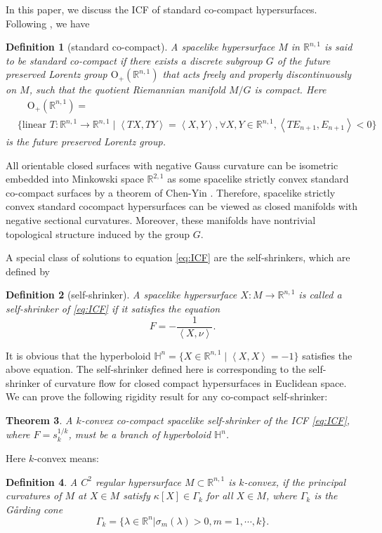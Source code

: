 \documentclass[10pt,a4paper]{amsart}
\newtheorem{theorem}{Theorem}[section]
\newcommand{\R}{\ensuremath{\mathbb{R}}}
\renewcommand{\H}{{\mathbb{H}}}
\newcommand{\ip}[2]{\ensuremath{\left< {#1}, {#2} \right>}}
\newtheorem{definition}[theorem]{Definition}
\numberwithin{equation}{section}
\begin{document}
\par In this paper, we discuss the ICF of standard co-compact hypersurfaces. Following \cite{co-compact}, we have 
\begin{definition}[standard co-compact]\label{defn:std co-compact}
A spacelike hypersurface $M$ in $\mathbb{R}^{n,1}$ is said to be standard co-compact if there exists a discrete subgroup $G$ of the future preserved Lorentz group $\mathrm{O}_+(\mathbb{R}^{n,1})$ that acts freely and properly discontinuously on $M$, such that the quotient Riemannian manifold $M/G$ is compact. Here 
$$ \begin{aligned}
    &\quad \mathrm{O}_+(\mathbb{R}^{n,1}) = \\
    & \Big\{\text{linear } T:\R^{n,1}\to \R^{n,1} \mid \ip{TX}{TY} = \ip{X}{Y}, \forall X,Y\in \R^{n,1}, \ip{TE_{n+1}}{E_{n+1}} < 0 \Big\}
\end{aligned} $$
is the future preserved Lorentz group. 
\end{definition} 
 All orientable closed surfaces with negative Gauss curvature can be isometric embedded into Minkowski space $\mathbb{R}^{2,1}$ as some spacelike strictly convex standard co-compact surfaces by a theorem of Chen-Yin \cite{ChYin}. Therefore, spacelike strictly convex standard cocompact hypersurfaces can be viewed as closed manifolds with negative sectional curvatures. Moreover, these manifolds have nontrivial topological structure induced by the group $G$.              



\par A special class of solutions to equation \eqref{eq:ICF} are the self-shrinkers, which are defined by 
\begin{definition}[self-shrinker]
    A spacelike hypersurface \(X:M\to \R^{n,1}\) is called a self-shrinker of \eqref{eq:ICF} if it satisfies the equation 
    \begin{equation}\label{eq:self-shrinker}
        F = -\frac{1}{\ip{X}{\nu}}.
    \end{equation}
\end{definition}

It is obvious that the hyperboloid \(\H^n = \{X\in \R^{n,1}\mid \ip{X}{X} = -1\}\) satisfies the above equation. The self-shrinker defined here is corresponding to the self-shrinker of curvature flow for closed compact hypersurfaces in Euclidean space.  
We can prove the following rigidity result for any co-compact self-shrinker: 
\begin{theorem}\label{lem:rigidity}
    A $k$-convex co-compact spacelike self-shrinker of the ICF \eqref{eq:ICF}, where \(F = s_k^{1/k}\), must be a branch of hyperboloid \(\H^n\). 
\end{theorem}
 Here $k$-convex means: 
 \begin{definition}
\label{intdef1}
A $C^2$ regular hypersurface $M\subset \R^{n, 1}$ is $k$-convex,
if the principal curvatures of $M$ at $X\in M$ satisfy $\kappa[X]\in\Gamma_k$ for all $X\in M$, where $\Gamma_k$
is the G\r{a}rding cone
\[\Gamma_k=\{\lambda\in\R^n|\sigma_m(\lambda)>0, m=1, \cdots, k\}.\]
\end{definition} 
 
\end{document}

